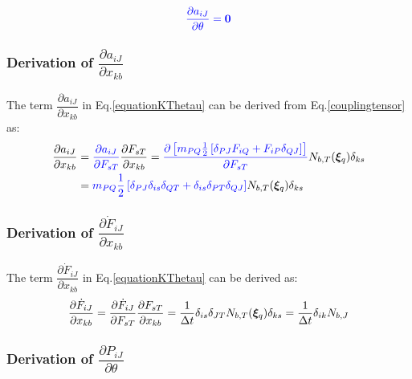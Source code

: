 \documentclass[oneside,11pt,times]{book}
\begin{document}
\begin{equation}
\begin{aligned}
\centering
\textcolor{blue}{\dfrac{\partial{a_{iJ}}}{\partial{\theta}}=\bm{0}}
\end{aligned}
\end{equation}



\subsubsection{Derivation of $\dfrac{\partial{{a_{iJ}}}}{\partial{x_{kb}}}$}

The term $\dfrac{\partial{{a_{iJ}}}}{\partial{x_{kb}}}$ in Eq.\eqref{equationKThetau} can be derived from Eq.\eqref{couplingtensor} as:
\begin{equation}
\begin{aligned}
\centering
\dfrac{\partial{{a_{iJ}}}}{\partial{x_{kb}}}&=\textcolor{blue}{\dfrac{\partial{{a_{iJ}}}}{\partial{F_{sT}}}}\dfrac{\partial{{F_{sT}}}}{\partial{x_{kb}}}=\textcolor{blue}{\dfrac{\partial\left[m_{PQ}\frac{1}{2}\left[\delta_{PJ}F_{iQ}+F_{iP}\delta_{QJ}\right]\right]}{\partial{F_{sT}}}}N_{b,T}(\bm{\xi}_q)\delta_{ks}\\&=\textcolor{blue}{m_{PQ}\frac{1}{2}\left[\delta_{PJ}\delta_{is}\delta_{QT}+\delta_{is}\delta_{PT}\delta_{  QJ}\right]}\textcolor{black}{N_{b,T}(\bm{\xi}_q)\delta_{ks}}
\end{aligned}
\label{equationdPhiTimedPhi}
\end{equation}
\subsubsection{Derivation of $\dfrac{\partial{{\dot{F}_{iJ}}}}{\partial{x_{kb}}}$}

The term $\dfrac{\partial{{\dot{F}_{iJ}}}}{\partial{x_{kb}}}$ in Eq.\eqref{equationKThetau} can be derived as:
\begin{equation}
\begin{aligned}
\centering
\dfrac{\partial{{\dot{F}_{iJ}}}}{\partial{x_{kb}}}=\dfrac{\partial{{\dot{F}_{iJ}}}}{\partial{F_{sT}}}\dfrac{\partial{{F_{sT}}}}{\partial{x_{kb}}}=\dfrac{1}{\Delta t}\delta_{is}\delta_{JT}N_{b,T}(\bm{\xi}_q)\delta_{ks}=\dfrac{1}{\Delta t}\delta_{ik}N_{b,J}
\end{aligned}
\label{equationdPhiTimedPhi}
\end{equation}

\subsubsection{Derivation of $\dfrac{\partial P_{iJ}}{ \partial{\theta}}$}
\end{document}
